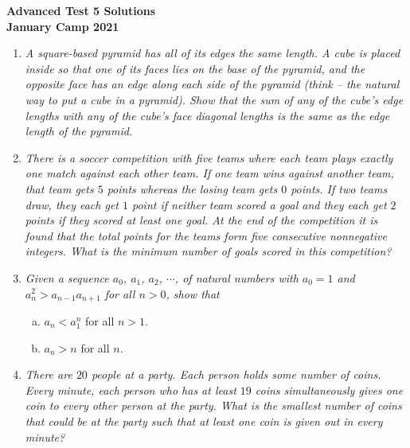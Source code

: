 \documentclass{article}
\begin{document}
\thispagestyle{empty}

\begin{center}
  \textbf{\Large Advanced Test 5 Solutions}
  \\ \vspace{1em}
  \textbf{\large January Camp 2021}
\end{center}

\vspace{12pt}

\begin{enumerate}[1.]

\item %
{\itshape A square-based pyramid has all of its edges the same length.
A cube is placed inside so that one of its faces lies on the base of the pyramid, and the opposite face has an edge along each side of the pyramid (think -- the natural way to put a cube in a pyramid).
Show that the sum of any of the cube's edge lengths with any of the cube's face diagonal lengths is the same as the edge length of the pyramid.}


\item %
{\itshape There is a soccer competition with five teams where each team plays exactly one match against each other team.
If one team wins against another team, that team gets $5$ points whereas the losing team gets $0$ points.
If two teams draw, they each get $1$ point if neither team scored a goal and they each get $2$ points if they scored at least one goal.
At the end of the competition it is found that the total points for the teams form five consecutive nonnegative integers.
What is the minimum number of goals scored in this competition?}


\item %
{\itshape Given a sequence $a_0$, $a_1$, $a_2$, $\cdots$, of natural numbers with $a_0 = 1$ and $a_{n}^2 > a_{n - 1}a_{n + 1}$ for all $n > 0$, show that 
\begin{enumerate}[a)]
  \item $a_n < a_1^n$ for all $n > 1$.
  \item $a_n > n$ for all $n$.
\end{enumerate}}


\item %
{\itshape There are $20$ people at a party. Each person holds some number of coins. Every minute, each person who has at least $19$ coins simultaneously gives one coin to every other person at the party. What is the smallest number of coins that could be at the party such that at least one coin is given out in every minute?}



\end{enumerate}
\end{document}

